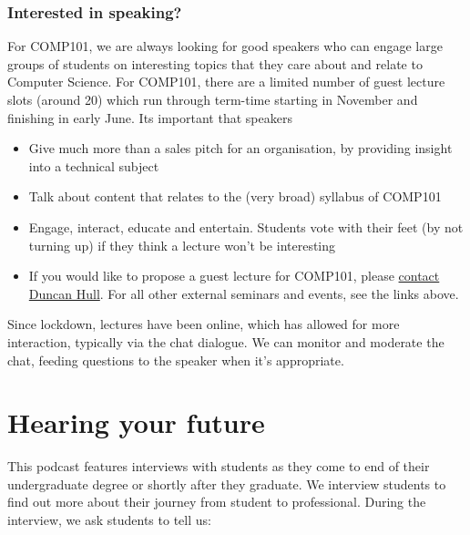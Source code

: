 \documentclass[
]{book}
\providecommand{\tightlist}{%
  \setlength{\itemsep}{0pt}\setlength{\parskip}{0pt}}
\begin{document}
\hypertarget{interested-in-speaking}{%
\subsection{Interested in speaking?}\label{interested-in-speaking}}

For COMP101, we are always looking for good speakers who can engage large groups of students on interesting topics that they care about and relate to Computer Science. For COMP101, there are a limited number of guest lecture slots (around 20) which run through term-time starting in November and finishing in early June. Its important that speakers

\begin{itemize}
\tightlist
\item
  Give much more than a sales pitch for an organisation, by providing insight into a technical subject
\item
  Talk about content that relates to the (very broad) syllabus of COMP101
\item
  Engage, interact, educate and entertain. Students vote with their feet (by not turning up) if they think a lecture won't be interesting
\item
  If you would like to propose a guest lecture for COMP101, please \href{http://www.cs.man.ac.uk/~hulld/contact.html}{contact Duncan Hull}. For all other external seminars and events, see the links above.
\end{itemize}

Since lockdown, lectures have been online, which has allowed for more interaction, typically via the chat dialogue. We can monitor and moderate the chat, feeding questions to the speaker when it's appropriate.

\hypertarget{hearing}{%
\chapter{Hearing your future}\label{hearing}}

This podcast features interviews with students as they come to end of their undergraduate degree or shortly after they graduate. We interview students to find out more about their journey from student to professional. During the interview, we ask students to tell us:
\end{document}
